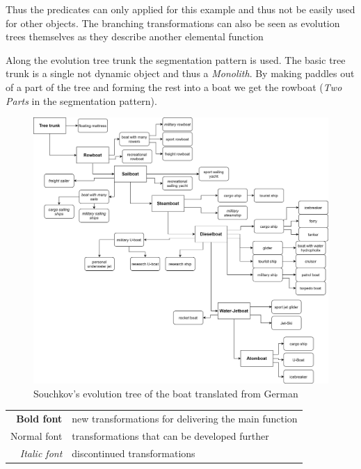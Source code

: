\documentclass[11pt,a4paper]{article}
\begin{document}
Thus the predicates can only applied for this example and thus not be easily used for other objects. The branching transformations can also be seen as evolution trees themselves as they describe another elemental function

Along the evolution tree trunk the segmentation pattern is used. The basic tree trunk is a single not dynamic object and thus a \textit{Monolith}. By making paddles out of a part of the tree and forming the rest into a boat we get the rowboat (\textit{Two Parts} in the segmentation pattern).  

\begin{figure}[htb]
	\centering
	\includegraphics[width=\linewidth]{figures/boat.png}
	\caption{\small Souchkov's evolution tree of the boat translated from German \cite{KS}}
	\label{fig:boat}
\end{figure}
\begin{tabular}{r@{: }l}
\textbf{Bold font} & new transformations for delivering the main function\\
Normal font & transformations that can be developed further\\
\textit{Italic font} & discontinued transformations
\end{tabular}
\end{document}
